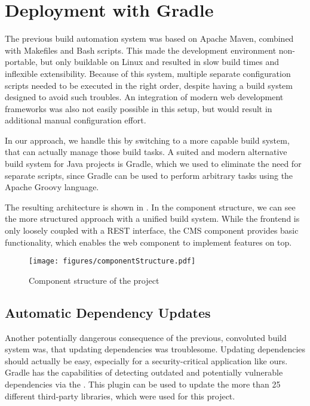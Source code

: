 \section{Deployment with Gradle}\label{sec:deploymentWithGradle}
The previous build automation system was based on Apache Maven, combined with Makefiles and Bash scripts.
This made the development environment non-portable, but only buildable on Linux and resulted in slow build times and
inflexible extensibility.
Because of this system, multiple separate configuration scripts needed to be executed in the right order, despite having
a build system designed to avoid such troubles.
An integration of modern web development frameworks was also not easily possible in this setup, but would result in
additional manual configuration effort.

In our approach, we handle this by switching to a more capable build system, that can actually manage those build tasks.
A suited and modern alternative build system for Java projects is Gradle, which we used to eliminate the need for
separate scripts, since Gradle can be used to perform arbitrary tasks using the Apache Groovy language.

The resulting architecture is shown in .
In the component structure, we can see the more structured approach with a unified build system.
While the frontend is only loosely coupled with a REST interface, the CMS component provides basic functionality, which
enables the web component to implement features on top.

\begin{figure}
    \centering
    \texttt{[image: figures/componentStructure.pdf]}
    \caption{Component structure of the project}
    \label{fig:componentStructure}
\end{figure}

\subsection*{Automatic Dependency Updates}
Another potentially dangerous consequence of the previous, convoluted build system was, that updating dependencies was
troublesome.
Updating dependencies should actually be easy, especially for a security-critical application like ours.
Gradle has the capabilities of detecting outdated and potentially vulnerable dependencies via the
.
This plugin can be used to update the more than 25 different third-party libraries, which were used for this project.

